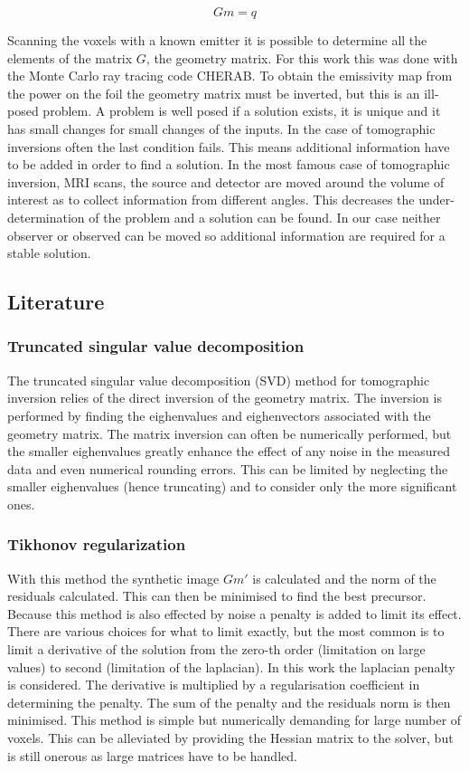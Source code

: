 \begin{equation}
Gm=q
\label{eq:gmq}
\end{equation}

Scanning the voxels with a known emitter it is possible to determine all the elements of the matrix $G$, the geometry matrix. For this work this was done with the Monte Carlo ray tracing code CHERAB. To obtain the emissivity map from the power on the foil the geometry matrix must be inverted, but this is an ill-posed problem. A problem is well posed if a solution exists, it is unique and it has small changes for small changes of the inputs. \cite{Hansen1998} In the case of tomographic inversions often the last condition fails. \cite{Hansen2010} This means additional information have to be added in order to find a solution. In the most famous case of tomographic inversion, MRI scans, the source and detector are moved around the volume of interest as to collect information from different angles. This decreases the under-determination of the problem and a solution can be found. In our case neither observer or observed can be moved so additional information are required for a stable solution.
\subsection{Literature}
\subsubsection{Truncated singular value decomposition}
The truncated singular value decomposition (SVD) method for tomographic inversion relies of the direct inversion of the geometry matrix. The inversion is performed by finding the eighenvalues and eighenvectors associated with the geometry matrix. The matrix inversion can often be numerically performed, but the smaller eighenvalues greatly enhance the effect of any noise in the measured data and even numerical rounding errors. This can be limited by neglecting the smaller eighenvalues (hence truncating) and to consider only the more significant ones.
\subsubsection{Tikhonov regularization}
With this method the synthetic image $Gm'$ is calculated and the norm of the residuals calculated. This can then be minimised to find the best precursor. Because this method is also effected by noise a penalty is added to limit its effect. There are various choices for what to limit exactly, but the most common is to limit a derivative of the solution from the zero-th order (limitation on large values) to second (limitation of the laplacian). In this work the laplacian penalty is considered. The derivative is multiplied by a regularisation coefficient in determining the penalty. The sum of the penalty and the residuals norm is then minimised. \cite{Schou2015} This method is simple but numerically demanding for large number of voxels. This can be alleviated by providing the Hessian matrix to the solver, but is still onerous as large matrices have to be handled.
